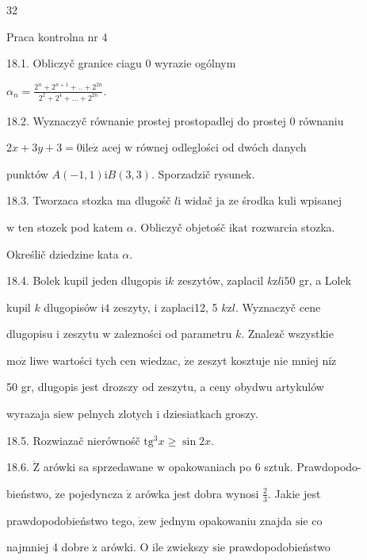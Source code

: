 \documentclass[a4paper,12pt]{article}
\begin{document}
32

Praca kontrolna nr 4

18.1. Obliczyč granice ciagu 0 wyrazie ogólnym

$\displaystyle \alpha_{n}=\frac{2^{n}+2^{n+1}+..+2^{2n}}{2^{2}+2^{4}+\ldots+2^{2n}}.$

18.2. Wyznaczyč równanie prostej prostopadlej do prostej $0$ równaniu

$2x+3y+3 = 0 \mathrm{i} \mathrm{l}\mathrm{e}\dot{\mathrm{z}}$ acej $\mathrm{w}$ równej odleglości od dwóch danych

punktów $A(-1,1)\mathrm{i}B(3,3)$. Sporzadzič rysunek.

18.3. Tworzaca stozka ma dlugośč $l \mathrm{i}$ widač $\mathrm{j}\mathrm{a}$ ze środka kuli wpisanej

$\mathrm{w}$ ten stozek pod katem $\alpha$. Obliczyč objetośč $\mathrm{i}\mathrm{k}\mathrm{a}\mathrm{t}$ rozwarcia stozka.

Określič dziedzine kata $\alpha.$

18.4. Bolek kupil jeden dlugopis $\mathrm{i}k$ zeszytów, zaplacil $k\mathrm{z}l\mathrm{i}50$ gr, a Lolek

kupil $k$ dlugopisów $\mathrm{i}4$ zeszyty, $\mathrm{i}$ zaplaci12, 5 $k\mathrm{z}l$. Wyznaczyč cene

dlugopisu $\mathrm{i}$ zeszytu $\mathrm{w}$ zalezności od parametru $k$. Znalez$\acute{}$č wszystkie

$\mathrm{m}\mathrm{o}\dot{\mathrm{z}}$ liwe wartości tych cen wiedzac, $\dot{\mathrm{z}}\mathrm{e}$ zeszyt kosztuje nie mniej $\mathrm{n}\mathrm{i}\dot{\mathrm{z}}$

50 gr, dlugopis jest drozszy od zeszytu, a ceny obydwu artykulów

wyrazaja $\mathrm{s}\mathrm{i}\mathrm{e}\mathrm{w}$ pelnych zlotych $\mathrm{i}$ dziesiatkach groszy.

18.5. Rozwiazač nierównośč $\mathrm{t}\mathrm{g}^{3}x\geq\sin 2x.$

18.6. $\dot{\mathrm{Z}}$ arówki sa sprzedawane $\mathrm{w}$ opakowaniach po 6 sztuk. Prawdopodo-

bieństwo, $\dot{\mathrm{z}}\mathrm{e}$ pojedyncza $\dot{\mathrm{z}}$ arówka jest dobra wynosi $\displaystyle \frac{2}{3}$. Jakie jest

prawdopodobieństwo tego, $\dot{\mathrm{z}}\mathrm{e} \mathrm{w}$ jednym opakowaniu znajda $\mathrm{s}\mathrm{i}\mathrm{e}$ co

najmniej 4 dobre $\dot{\mathrm{z}}$ arówki. $\mathrm{O}$ ile zwiekszy $\mathrm{s}\mathrm{i}\mathrm{e}$ prawdopodobieństwo
\end{document}
